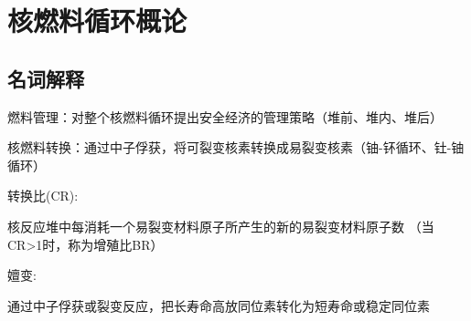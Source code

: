 \documentclass[openany]{ctexart}
\numberwithin{equation}{section} %
\begin{document}
\vspace{1.2ex}
\newpage

\section{核燃料循环概论}
\subsection{名词解释}
燃料管理：对整个核燃料循环提出安全经济的管理策略（堆前、堆内、堆后）

核燃料转换：通过中子俘获，将可裂变核素转换成易裂变核素（铀-钚循环、钍-铀循环）

转换比(CR):\hspace{0.11111em}
\begin{minipage}[t]{\linewidth}
核反应堆中每消耗一个易裂变材料原子所产生的新的易裂变材料原子数\newline
（当CR>1时，称为增殖比BR）
\end{minipage}
\vspace{0.05cm}

嬗变:\hspace{0.11111em}
\begin{minipage}[t]{\linewidth}
	通过中子俘获或裂变反应，把长寿命高放同位素转化为短寿命或稳定同位素
\end{minipage}
\end{document}
